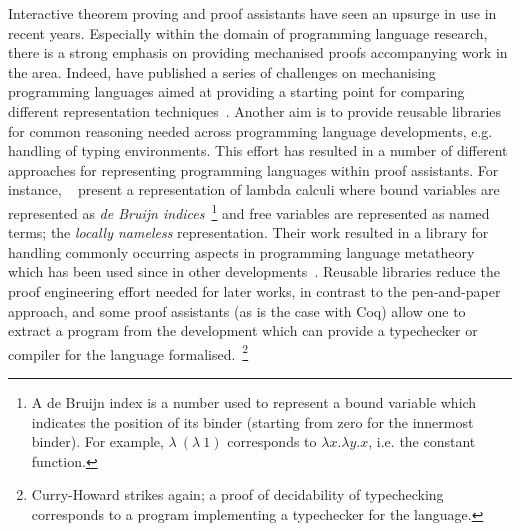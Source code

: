 \documentclass{mprop}
\newcommand{\1}{\textbf{1}\xspace}
\begin{document}
Interactive theorem proving and proof assistants have seen an upsurge in use in recent years. Especially within the domain of programming language research, there is a strong emphasis on providing mechanised proofs accompanying work in the area. Indeed, \citeauthor{Aydemir:2005:MMM} have published a series of challenges on mechanising programming languages aimed at providing a starting point for comparing different representation techniques~\cite{Aydemir:2005:MMM}. Another aim is to provide reusable libraries for common reasoning needed across programming language developments, e.g. handling of typing environments. This effort has resulted in a number of different approaches for representing programming languages within proof assistants. For instance, \citeauthor{Aydemir:2008:EFM}~\cite{Aydemir:2008:EFM} present a representation of lambda calculi where bound variables are represented as \textit{de Bruijn indices}~\footnote{A de Bruijn index is a number used to represent a bound variable which indicates the position of its binder (starting from zero for the innermost binder). For example, $\lambda~(\lambda~1)$ corresponds to $\lambda x. \lambda y. x$, i.e. the constant function.} and free variables are represented as named terms; the \textit{locally nameless} representation. Their work resulted in a library for handling commonly occurring aspects in programming language metatheory which has been used since in other developments~\cite{Park:2014:MMW}. Reusable libraries reduce the proof engineering effort needed for later works, in contrast to the pen-and-paper approach, and some proof assistants (as is the case with Coq) allow one to extract a program from the development which can provide a typechecker or compiler for the language formalised.~\footnote{Curry-Howard strikes again; a proof of decidability of typechecking corresponds to a program implementing a typechecker for the language.}
\end{document}
